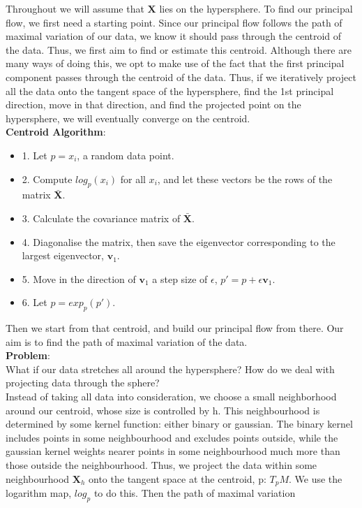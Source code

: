 \documentclass[12pt]{report}
\begin{document}
Throughout we will assume that $\textbf{X}$ lies on the hypersphere. 
To find our principal flow, we first need a starting point. Since our principal flow 
follows the path of maximal variation of our data, 
we know it should pass through the centroid of the data. 
Thus, we first aim to find or estimate this centroid.
Although there are many ways of doing this, we opt to make use of the fact that 
the first principal component passes through the centroid of the data. Thus, if we 
iteratively project all the data onto the tangent space of the hypersphere, 
find the 1st principal direction, move in that direction, 
and find the projected point on the hypersphere, we will eventually converge on the 
centroid.
\\
\textbf{Centroid Algorithm}:
\begin{itemize}
    \item 1. Let $p = x_i$, a random data point.
    \item 2. Compute $log_p(x_i)$ for all $x_i$, and let these vectors be the rows of the matrix $\bar{\textbf{X}}$.
    \item 3. Calculate the covariance matrix of $\bar{\textbf{X}}$.
    \item 4. Diagonalise the matrix, then save the eigenvector corresponding to the largest eigenvector, $\textbf{v}_1$.
    \item 5. Move in the direction of $\textbf{v}_1$ a step size of $\epsilon$, $p' = p + \epsilon \textbf{v}_1$.
    \item 6. Let $p = exp_p(p')$.
\end{itemize}
Then we start from that centroid, and build our principal flow from there.
Our aim is to find the path of maximal variation of the data.\\
\textbf{Problem}:\\
What if our data stretches all around the hypersphere? How do we deal with projecting
data through the sphere?\\
Instead of taking all data into consideration, we choose a small neighborhood around
our centroid, whose size is controlled by h. This neighbourhood is determined 
by some kernel function: either binary or gaussian. The binary kernel 
includes points in some neighbourhood and excludes points outside,
while the gaussian kernel weights nearer points in some neighbourhood 
much more than those outside the neighbourhood. Thus, we
project the data within some neighbourhood $\textbf{X}_h$ onto the tangent space 
at the centroid, p: $T_pM$. We use the logarithm map, $log_p$ to do this. Then the path of maximal variation 
\end{document}
